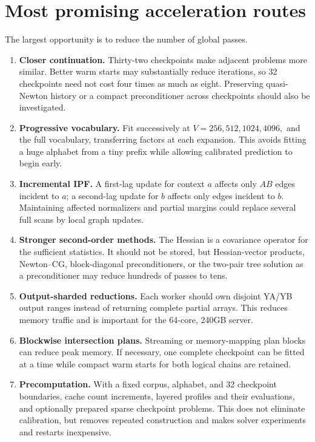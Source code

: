 \documentclass[11pt]{article}
\begin{document}
\section{Most promising acceleration routes}

The largest opportunity is to reduce the number of global passes.

\begin{enumerate}
\item \textbf{Closer continuation.}  Thirty-two checkpoints make adjacent
      problems more similar.  Better warm starts may substantially reduce
      iterations, so 32 checkpoints need not cost four times as much as
      eight.  Preserving quasi-Newton history or a compact preconditioner
      across checkpoints should also be investigated.

\item \textbf{Progressive vocabulary.}  Fit successively at
      $V=256,512,1024,4096,$ and the full vocabulary, transferring factors
      at each expansion.  This avoids fitting a huge alphabet from a tiny
      prefix while allowing calibrated prediction to begin early.

\item \textbf{Incremental IPF.}  A first-lag update for context $a$ affects
      only $AB$ edges incident to $a$; a second-lag update for $b$ affects
      only edges incident to $b$.  Maintaining affected normalizers and
      partial margins could replace several full scans by local graph
      updates.

\item \textbf{Stronger second-order methods.}  The Hessian is a covariance
      operator for the sufficient statistics.  It should not be stored, but
      Hessian-vector products, Newton--CG, block-diagonal preconditioners, or
      the two-pair tree solution as a preconditioner may reduce hundreds of
      passes to tens.

\item \textbf{Output-sharded reductions.}  Each worker should own disjoint
      YA/YB output ranges instead of returning complete partial arrays.
      This reduces memory traffic and is important for the 64-core,
      240GB server.

\item \textbf{Blockwise intersection plans.}  Streaming or memory-mapping
      plan blocks can reduce peak memory.  If necessary, one complete
      checkpoint can be fitted at a time while compact warm starts for both
      logical chains are retained.

\item \textbf{Precomputation.}  With a fixed corpus, alphabet, and 32
      checkpoint boundaries, cache count increments, layered profiles and
      their evaluations, and optionally prepared sparse checkpoint problems.
      This does not eliminate calibration, but removes repeated construction
      and makes solver experiments and restarts inexpensive.
\end{enumerate}
\end{document}
